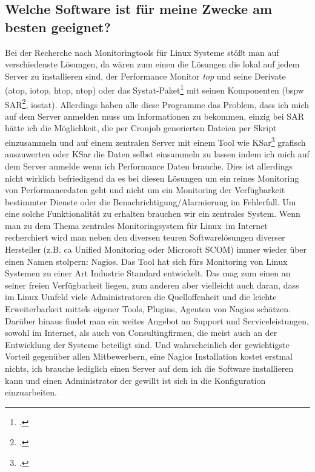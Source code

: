 \documentclass[12pt,a4paper,parskip,listof=totoc,bibliography=totoc]{scrreprt}
\begin{document}
	\subsection{Welche Software ist für meine Zwecke am besten geeignet?}
	Bei der Recherche nach Monitoringtools für Linux Systeme stößt man auf verschiedenste Lösungen, da wären zum einen die Lösungen die lokal auf jedem Server zu installieren sind, der Performance Monitor \textit{top} und seine Derivate (atop, iotop, htop, ntop) oder das Systat-Paket\footcite{sysstat} mit seinen Komponenten (\acrlong{bspw} SAR\footcite{sarkrenn}, iostat). Allerdings haben alle diese Programme das Problem, dass ich mich auf dem Server anmelden muss um Informationen zu bekommen, einzig bei SAR hätte ich die Möglichkeit, die per Cronjob generierten Dateien per Skript einzusammeln und auf einem zentralen Server mit einem Tool wie KSar\footcite{ksar} grafisch auszuwerten oder KSar die Daten selbst einsammeln zu lassen indem ich mich auf dem Server anmelde wenn ich Performance Daten brauche. Dies ist allerdings nicht wirklich befriedigend da es bei diesen Lösungen um ein reines Monitoring von Performancedaten geht und nicht um ein Monitoring der Verfügbarkeit bestimmter Dienste oder die Benachrichtigung/Alarmierung im Fehlerfall. Um eine solche Funktionalität zu erhalten brauchen wir ein zentrales System. 
	Wenn man zu dem Thema \glqq zentrales Monitoringsystem für Linux\grqq\ im Internet recherchiert wird man neben den diversen teuren Softwarelösungen diverser Hersteller (z.B. \acrlong{ca} Unified Monitoring oder Microsoft SCOM) immer wieder über einen Namen stolpern: Nagios. Das Tool hat sich fürs Monitoring von Linux Systemen zu einer Art Industrie Standard entwickelt. Das mag zum einen an seiner freien Verfügbarkeit liegen, zum anderen aber vielleicht auch daran, dass im Linux Umfeld viele Administratoren die Quelloffenheit und die leichte Erweiterbarkeit mittels eigener Tools, Plugins, Agenten von Nagios schätzen. Darüber hinaus findet man ein weites Angebot an Support und Serviceleistungen, sowohl im Internet, als auch von Consultingfirmen, die meist auch an der Entwicklung der Systeme beteiligt sind. Und wahrscheinlich der gewichtigste Vorteil gegenüber allen Mitbewerbern, eine Nagios Installation kostet erstmal nichts, ich brauche lediglich einen Server auf dem ich die Software installieren kann und einen Administrator der gewillt ist sich in die Konfiguration einzuarbeiten. 
	
\end{document}
